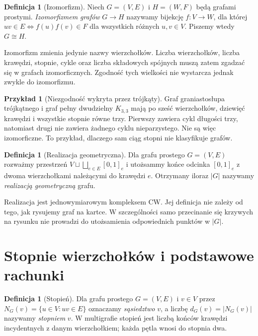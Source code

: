 \documentclass[11pt,a4paper]{report}
\numberwithin{equation}{section}
\theoremstyle{plain}
\theoremstyle{definition}
\newtheorem{definicja}[twierdzenie]{Definicja}
\newtheorem{przyklad}[twierdzenie]{Przykład}
\theoremstyle{remark}
\begin{document}
\begin{definicja}[Izomorfizm]
Niech $G=(V,E)$ i $H=(W,F)$ będą grafami prostymi.
\emph{Izomorfizmem grafów} $G\to H$ nazywamy bijekcję
$f:V\to W$, dla której
$uv\in E\iff f(u)f(v)\in F$ dla wszystkich różnych $u,v\in V$.
Piszemy wtedy $G\cong H$.
\end{definicja}

Izomorfizm zmienia jedynie nazwy wierzchołków. Liczba wierzchołków,
liczba krawędzi, stopnie, cykle oraz liczba składowych spójnych
muszą zatem zgadzać się w grafach izomorficznych. Zgodność tych
wielkości nie wystarcza jednak zwykle do izomorfizmu.

\begin{przyklad}[Niezgodność wykryta przez trójkąty]
Graf graniastosłupa trójkątnego i graf pełny dwudzielny $K_{3,3}$
mają po sześć wierzchołków, dziewięć krawędzi i wszystkie stopnie
równe trzy. Pierwszy zawiera cykl długości trzy, natomiast drugi
nie zawiera żadnego cyklu nieparzystego. Nie są więc izomorficzne.
To przykład, dlaczego sam ciąg stopni nie klasyfikuje grafów.
\end{przyklad}

\begin{definicja}[Realizacja geometryczna]
Dla grafu prostego $G=(V,E)$ rozważmy przestrzeń
$V\sqcup\bigsqcup_{e\in E}[0,1]_e$ i utożsammy
końce odcinka $[0,1]_e$ z dwoma wierzchołkami
należącymi do krawędzi $e$. Otrzymany iloraz
$|G|$ nazywamy \emph{realizacją geometryczną} grafu.
\end{definicja}

Realizacja jest jednowymiarowym kompleksem CW. Jej definicja nie
zależy od tego, jak rysujemy graf na kartce. W szczególności
samo przecinanie się krzywych na rysunku nie prowadzi do
utożsamienia odpowiednich punktów w $|G|$.

\section{Stopnie wierzchołków i podstawowe rachunki}
\label{sec:tg-stopnie}

\begin{definicja}[Stopień]
Dla grafu prostego $G=(V,E)$ i $v\in V$ przez
$N_G(v)=\{u\in V:uv\in E\}$ oznaczamy
\emph{sąsiedztwo} $v$, a liczbę $d_G(v)=|N_G(v)|$
nazywamy \emph{stopniem} $v$. W multigrafie stopień
jest liczbą końców krawędzi incydentnych z danym
wierzchołkiem; każda pętla wnosi do stopnia dwa.
\end{definicja}
\end{document}
